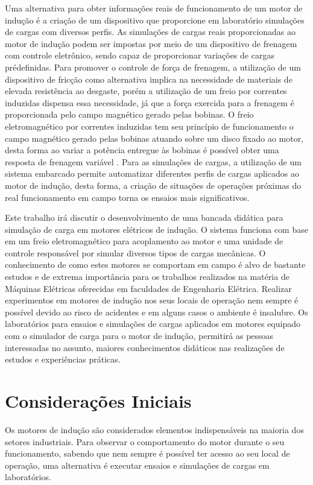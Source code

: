 Uma alternativa para obter informações reais de funcionamento de um motor de indução é a criação de um dispositivo que proporcione em laboratório simulações de cargas com diversos  perfis.  As simulações de cargas reais proporcionadas ao motor de indução podem ser impostas por meio de um dispositivo de frenagem com controle eletrônico, sendo capaz de proporcionar  variações de cargas  prédefinidas. Para promover o controle de força de frenagem, a utilização de um dispositivo de fricção como alternativa  implica na necessidade de materiais de elevada resistência ao desgaste, porém  a utilização de um freio por correntes induzidas dispensa essa necessidade, já que a força exercida para a frenagem é proporcionada pelo campo magnético gerado pelas bobinas. O freio eletromagnético por correntes induzidas tem seu princípio de funcionamento o campo magnético gerado pelas bobinas atuando sobre um disco fixado ao motor, desta forma ao variar a potência entregue às bobinas é possível obter uma resposta de frenagem variável \cite{Nolasco2013}. 
Para as simulações de cargas, a utilização de um sistema embarcado  permite  automatizar  diferentes perfis de cargas aplicados ao motor de indução, desta forma, a criação de situações de operações próximas do real funcionamento em campo  torna os ensaios mais significativos. 


Este trabalho irá discutir o desenvolvimento de uma bancada didática para simulação de carga em motores elétricos de indução. O sistema funciona com base em um freio eletromagnético para acoplamento ao motor e uma unidade de controle responsável por simular diversos tipos de cargas mecânicas. O conhecimento de como estes motores se comportam em campo é alvo de bastante estudos e de extrema importância para os trabalhos realizados na matéria de Máquinas Elétricas oferecidas em faculdades de Engenharia Elétrica. Realizar experimentos em motores de indução  nos seus locais de operação nem sempre é possível devido ao risco de acidentes e em alguns casos o ambiente é insalubre.  Os laboratórios para ensaios e simulações de cargas aplicados em motores equipado com o simulador de carga para o motor de indução, permitirá as pessoas interessadas no assunto, maiores conhecimentos didáticos nas realizações de estudos e experiências práticas.


\section{Considerações Iniciais}

Os motores de indução são considerados elementos indispensáveis na maioria dos setores industriais. Para observar o comportamento do motor durante o seu funcionamento, sabendo que nem sempre é possível ter acesso ao seu local de operação, uma alternativa é executar ensaios e simulações de cargas em laboratórios.  

